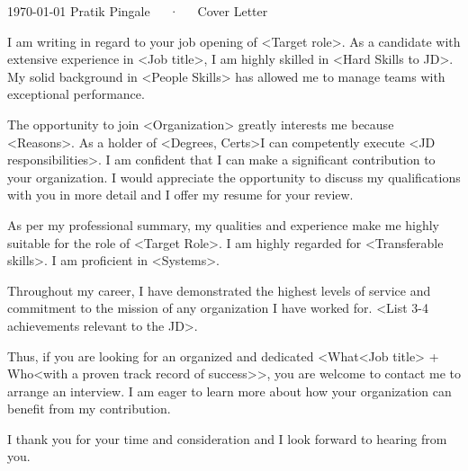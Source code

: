\documentclass[11pt, a4paper]{awesome-cv}
\begin{document}
\makecvheader[R]

\makecvfooter
  {\today}
  {Pratik Pingale~~~·~~~Cover Letter}
  {}

\makelettertitle

\begin{cvletter}


I am writing in regard to your job opening of <Target role>. As a candidate with extensive experience in <Job title>, I am highly skilled in <Hard Skills to JD>. My solid background in <People Skills> has allowed me to manage teams with exceptional performance.

The opportunity to join <Organization> greatly interests me because <Reasons>. As a holder of <Degrees, Certs>I can competently execute <JD responsibilities>.
I am confident that I can make a significant contribution to your organization. I would appreciate the opportunity to discuss my qualifications with you in more detail and I offer my resume for your review.

As per my professional summary, my qualities and experience make me highly suitable for the role of <Target Role>.
I am highly regarded for <Transferable skills>. I am proficient in <Systems>.

Throughout my career, I have demonstrated the highest levels of service and commitment to the mission of any organization I have worked for. <List 3-4 achievements relevant to the JD>.

Thus, if you are looking for an organized and dedicated <What<Job title> + Who<with a proven track record of success>>, you are welcome to contact me to arrange an interview. I am eager to learn more about how your organization can benefit from my contribution.

I thank you for your time and consideration and I look forward to hearing from you.

\end{cvletter}


\makeletterclosing

\end{document}
